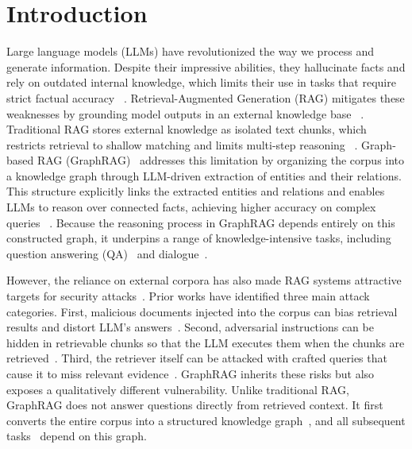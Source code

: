 \documentclass[letterpaper]{article} %
\begin{document}
\section{Introduction}
Large language models (LLMs) have revolutionized the way we process and generate information.
Despite their impressive abilities, they hallucinate facts and rely on outdated internal knowledge, which limits their use in tasks that require strict factual accuracy ~\cite{DBLP:journals/csur/JiLFYSXIBMF23, DBLP:journals/corr/abs-2303-08774,DBLP:conf/coling/BianH0L0HJD24}.
Retrieval-Augmented Generation (RAG) mitigates these weaknesses by grounding model outputs in an external knowledge base ~\cite{DBLP:conf/icml/BorgeaudMHCRM0L22,DBLP:journals/corr/abs-2201-08239,DBLP:conf/nips/LewisPPPKGKLYR020}.
Traditional RAG stores external knowledge as isolated text chunks, which restricts retrieval to shallow matching and limits multi-step reasoning ~\cite{DBLP:conf/iclr/AsaiWWSH24}.
Graph-based RAG (GraphRAG)~\cite{DBLP:journals/corr/abs-2404-16130} addresses this limitation by organizing the corpus into a knowledge graph through LLM-driven extraction of entities and their relations.
This structure explicitly links the extracted entities and relations and enables LLMs to reason over connected facts, achieving higher accuracy on complex queries ~\cite{DBLP:journals/corr/abs-2410-05779,DBLP:journals/corr/abs-2501-00309}.
Because the reasoning process in GraphRAG depends entirely on this constructed graph, it underpins a range of knowledge-intensive tasks, including question answering (QA) ~\cite{DBLP:conf/naacl/YasunagaRBLL21,DBLP:conf/emnlp/KarpukhinOMLWEC20}and dialogue~\cite{DBLP:journals/sigkdd/ChenLYT17}.

However, the reliance on external corpora has also made RAG systems attractive targets for security attacks~\cite{DBLP:journals/corr/abs-2412-17011,DBLP:conf/acl/ZengZHLX000WYT24}.
Prior works have identified three main attack categories.
First, malicious documents injected into the corpus can bias retrieval results and distort LLM's answers~\cite{DBLP:journals/corr/abs-2402-07867,DBLP:journals/corr/abs-2402-08416,DBLP:journals/corr/abs-2405-13401}.
Second, adversarial instructions can be hidden in retrievable chunks so that the LLM executes them when the chunks are retrieved~\cite{DBLP:conf/camlis/HinesLHZZK24,DBLP:journals/corr/abs-2401-07612}.
Third, the retriever itself can be attacked with crafted queries that cause it to miss relevant evidence~\cite{DBLP:conf/emnlp/WallaceFKGS19,DBLP:journals/corr/abs-2406-05870}. GraphRAG inherits these risks but also exposes a qualitatively different vulnerability.
Unlike traditional RAG, GraphRAG does not answer questions directly from retrieved context.
It first converts the entire corpus into a structured knowledge graph~\cite{DBLP:journals/eswa/ChenJX20,DBLP:journals/access/ChenWZCZD20}, and all subsequent tasks~\cite{DBLP:conf/coling/KimHKS20,DBLP:conf/www/WangZZLXG19} depend on this graph.
\end{document}
